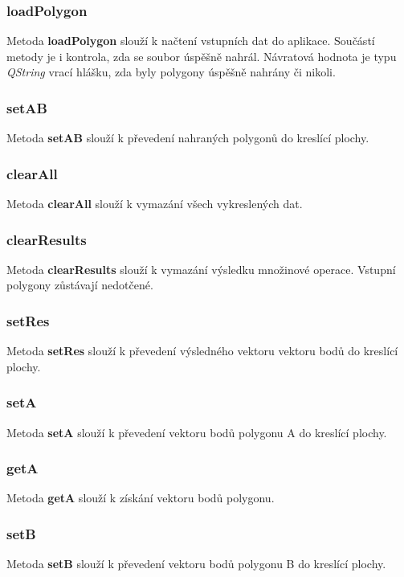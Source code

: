 \documentclass[a4paper, 12pt]{article}
\begin{document}
\subsubsection*{loadPolygon}
Metoda \textbf{loadPolygon} slouží k načtení vstupních dat do aplikace. Součástí metody je i kontrola, zda se soubor úspěšně nahrál. Návratová hodnota je typu \textsl{QString} vrací hlášku, zda byly polygony úspěšně nahrány či nikoli.

\subsubsection*{setAB}
Metoda \textbf{setAB} slouží k převedení nahraných polygonů do kreslící plochy.

\subsubsection*{clearAll}
Metoda \textbf{clearAll} slouží k vymazání všech vykreslených dat.

\subsubsection*{clearResults}
Metoda \textbf{clearResults} slouží k vymazání výsledku množinové operace. Vstupní polygony zůstávají nedotčené.

\subsubsection*{setRes}
Metoda \textbf{setRes} slouží k převedení výsledného vektoru vektoru bodů do kreslící plochy.

\subsubsection*{setA}
Metoda \textbf{setA} slouží k převedení vektoru bodů polygonu A do kreslící plochy.

\subsubsection*{getA}
Metoda \textbf{getA} slouží k získání vektoru bodů polygonu.

\subsubsection*{setB}
Metoda \textbf{setB} slouží k převedení vektoru bodů polygonu B do kreslící plochy.
\end{document}
